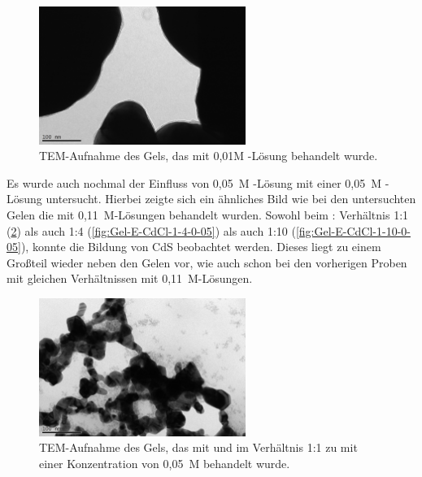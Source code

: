 		\begin{figure}[H]
			\centering
			\includegraphics[width=0.6\textwidth]{Bilder/Gel-E-CdS-0,01} 	
			\caption{TEM-Aufnahme des Gels, das mit 0,01M -Lösung behandelt wurde.}
			\label{fig:Gel-E-CdS-0-01}
		\end{figure}
		
		Es wurde auch nochmal der Einfluss von  0,05~M -Lösung mit einer  0,05~M -Lösung untersucht.
		Hierbei zeigte sich ein ähnliches Bild wie bei den untersuchten Gelen die mit 0,11~M-Lösungen behandelt wurden.
		Sowohl beim  : Verhältnis 1:1 (\cref{fig:Gel-E-CdCl-1-1-0-05}) als auch 1:4 (\cref{fig:Gel-E-CdCl-1-4-0-05}) als auch 1:10 (\cref{fig:Gel-E-CdCl-1-10-0-05}), konnte die Bildung von CdS beobachtet werden.
		Dieses liegt zu einem Großteil wieder neben den Gelen vor, wie auch schon bei den vorherigen Proben mit gleichen Verhältnissen mit 0,11~M-Lösungen.
		
		\begin{figure}[H]
			\centering
			\includegraphics[width=0.6\textwidth]{Bilder/Gel-E-CdCl-1-1-0,05} 	
			\caption{TEM-Aufnahme des Gels, das mit  und  im Verhältnis 1:1  zu  mit einer Konzentration von 0,05~M behandelt wurde.}
			\label{fig:Gel-E-CdCl-1-1-0-05}
		\end{figure}
		
